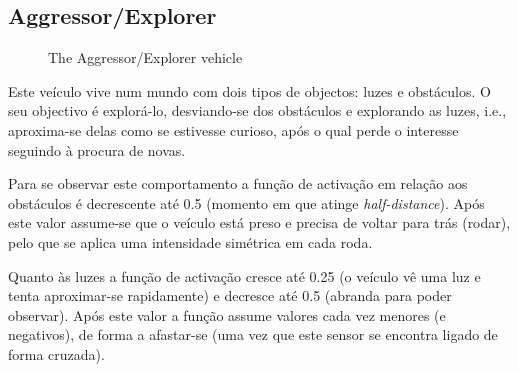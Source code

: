 \documentclass[a4paper]{article}
\begin{document}
\subsection{Aggressor/Explorer}
\begin{figure}[h]
	\centering
	
	\caption{The Aggressor/Explorer vehicle}
\end{figure}

Este veículo vive num mundo com dois tipos de objectos: luzes e obstáculos.
O seu objectivo é explorá-lo, desviando-se dos obstáculos e explorando as luzes, i.e.,
aproxima-se delas como se estivesse curioso, após o qual perde o interesse seguindo à procura de novas.

Para se observar este comportamento a função de activação em relação aos obstáculos é decrescente até 0.5 (momento em que atinge \emph{half-distance}).
Após este valor assume-se que o veículo está preso e precisa de voltar para trás (rodar), pelo que se aplica uma intensidade simétrica em cada roda.

Quanto às luzes a função de activação cresce até 0.25 (o veículo vê uma luz e tenta aproximar-se rapidamente) e decresce até 0.5 (abranda para poder observar).
Após este valor a função assume valores cada vez menores (e negativos), de forma a afastar-se (uma vez que este sensor se encontra ligado de forma cruzada).

\cleardoublepage
\end{document}
